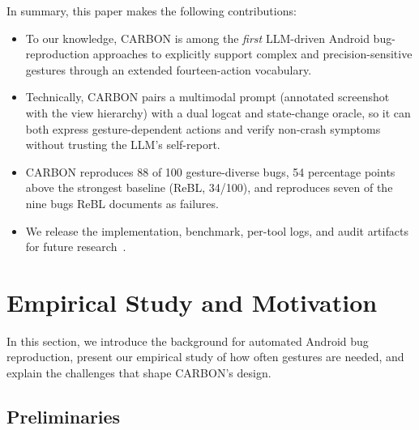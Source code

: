 \documentclass[10pt,conference,a4paper]{IEEEtran}
\begin{document}
  In summary, this paper makes the following contributions:
  \begin{itemize}
  \item To our knowledge, CARBON is among the \emph{first} LLM-driven Android bug-reproduction approaches to explicitly support complex and precision-sensitive gestures through an extended fourteen-action vocabulary.
  \item Technically, CARBON pairs a multimodal prompt (annotated screenshot with the view hierarchy) with a dual logcat and state-change oracle, so it can both express gesture-dependent actions and verify non-crash symptoms without trusting the LLM's self-report.
  \item CARBON reproduces 88 of 100 gesture-diverse bugs, 54 percentage points above the strongest baseline (ReBL, 34/100), and reproduces seven of the nine bugs ReBL documents as failures.
  \item We release the implementation, benchmark, per-tool logs, and audit artifacts for future research~\cite{carbon}.
  \end{itemize}

  \section{Empirical Study and Motivation}
  \label{sec:motivation}

  In this section, we introduce the background for automated Android bug
  reproduction, present our empirical study of how often gestures are
  needed, and explain the challenges that shape CARBON's design.

  \subsection{Preliminaries}
  \label{sec:prelim}
\end{document}
